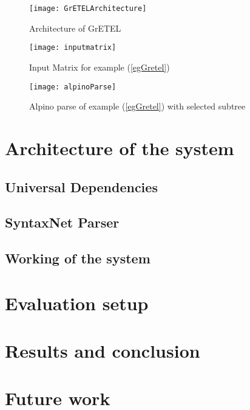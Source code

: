 \documentclass[]{scrartcl}
\theoremstyle{exmp}
\begin{document}
\begin{figure}[h]
	\texttt{[image: GrETELArchitecture]}
	\centering
	\caption{Architecture of GrETEL}
	\label{GArch}
\end{figure}

\begin{figure}[h]
	\texttt{[image: inputmatrix]}
	\centering
	\caption{Input Matrix for example (\ref{egGretel})}
	\label{Matrix}
\end{figure}

\begin{figure}[h]
	\texttt{[image: alpinoParse]}
	\centering
	\caption{Alpino parse of example (\ref{egGretel}) with selected subtree}
	\label{subtree}	
\end{figure}

\section{Architecture of the system}\label{Architecture}

\subsection{Universal Dependencies}\label{UD}

\subsection{SyntaxNet Parser}\label{Syntaxnet}

\subsection{Working of the system}

\section{Evaluation setup}\label{Evaluation}

\section{Results and conclusion}\label{Result}

\section{Future work}\label{FutureWork}
\end{document}
